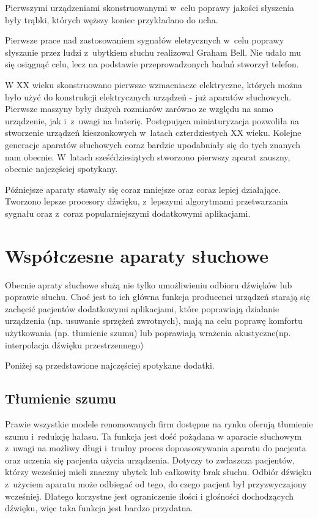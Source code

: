 \documentclass[journal]{IEEEtran}
\begin{document}
Pierwszymi urządzeniami skonstruowanymi w~celu poprawy jakości słyszenia były trąbki, których węższy koniec przykładano do ucha.

Pierwsze prace nad zastosowaniem sygnałów eletrycznych w~celu poprawy słyszanie przez ludzi z~ubytkiem słuchu realizował Graham Bell. Nie udało mu się osiągnąć celu, lecz na podstawie przeprowadzonych badań stworzył telefon.

W XX wieku skonstruowano pierwsze wzmacniacze elektryczne, których można było użyć do konstrukcji elektrycznych urządzeń - już aparatów słuchowych. Pierwsze maszyny były dużych rozmiarów zarówno ze względu na samo urządzenie, jak i~z~uwagi na baterię. Postępująca miniaturyzacja pozwoliła na stworzenie urządzeń kieszonkowych w~latach czterdziestych XX wieku. Kolejne generacje aparatów słuchowych coraz bardzie upodabniały się do tych znanych nam obecnie. W~latach sześćdziesiątych stworzono pierwszy aparat zauszny, obecnie najczęściej spotykany.

Późniejsze aparaty stawały się coraz mniejsze oraz coraz lepiej działające. Tworzono lepsze procesory dźwięku, z~lepszymi algorytmami przetwarzania sygnału oraz z~coraz popularniejszymi dodatkowymi aplikacjami.

\section{Współczesne aparaty słuchowe}

Obecnie apraty słuchowe służą nie tylko umożliwieniu odbioru dźwięków lub poprawie słuchu. Choć jest to ich główna funkcja producenci urządzeń starają się zachęcić pacjentów dodatkowymi aplikacjami, które poprawiają działanie urządzenia (np. usuwanie sprzężeń zwrotnych), mają na celu poprawę komfortu użytkowania (np. tłumienie szumu) lub poprawiają wrażenia akustyczne(np. interpolacja dźwięku przestrzennego)

Poniżej są przedstawione najczęściej spotykane dodatki.

\subsection{Tłumienie szumu}

Prawie wszystkie modele renomowanych firm dostępne na rynku oferują tłumienie szumu i~redukcję hałasu. Ta funkcja jest dość pożądana w aparacie słuchowym z~uwagi na możliwy długi i~trudny proces dopoasowywania aparatu do pacjenta oraz uczenia się pacjenta użycia urządzenia. Dotyczy to zwłaszcza pacjentów, którzy wcześniej mieli znaczny ubytek lub całkowity brak słuchu. Odbiór dźwięku z~użyciem aparatu może odbiegać od tego, do czego pacjent był przyzwyczajony wcześniej. Dlatego korzystne jest ograniczenie ilości i głośności dochodzących dźwięku, więc taka funkcja jest bardzo przydatna.
\end{document}
